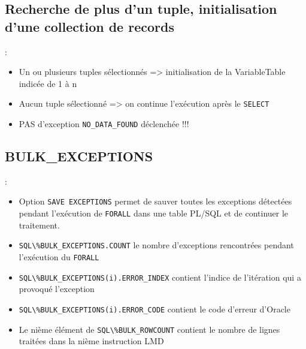 \documentclass[10pt]{beamer}
\begin{document}
\subsection{Recherche de plus d'un tuple, initialisation d'une collection de records}
\begin{frame}{\secname : \subsecname}
    
    \begin{itemize}
        \item Un ou plusieurs tuples sélectionnés => initialisation de la VariableTable indicée de 1 à n
        \item Aucun tuple sélectionné => on continue l'exécution après le \lstinline[language=plsql]!SELECT!
        \item PAS d'exception \lstinline[language=plsql]!NO_DATA_FOUND! déclenchée !!!
    \end{itemize}
\end{frame}

\subsection{BULK\_EXCEPTIONS}
\begin{frame}{\secname : \subsecname}
    \begin{itemize}
        \item Option \lstinline[language=plsql]!SAVE EXCEPTIONS! permet de sauver toutes les exceptions détectées pendant l’exécution de \lstinline[language=plsql]!FORALL! dans une table PL/SQL et de continuer le traitement.
        \item \lstinline[language=plsql]!SQL\%BULK_EXCEPTIONS.COUNT! le nombre d’exceptions rencontrées pendant l’exécution du \lstinline[language=plsql]!FORALL!
        \item \lstinline[language=plsql]!SQL\%BULK_EXCEPTIONS(i).ERROR_INDEX! contient l’indice de l’itération qui a provoqué l’exception
        \item \lstinline[language=plsql]!SQL\%BULK_EXCEPTIONS(i).ERROR_CODE! contient le code d’erreur d’Oracle
        \item Le nième élément de \lstinline[language=plsql]!SQL\%BULK_ROWCOUNT! contient le nombre de lignes traitées dans la nième instruction LMD
    \end{itemize}
\end{frame}


\end{document}
